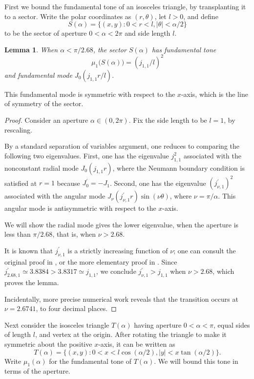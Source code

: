\documentclass[11pt,reqno]{amsart}
\newtheorem{lemma}[theorem]{Lemma}
\numberwithin{equation}{section}
\begin{document}
First we bound the fundamental tone of an isosceles triangle, by
transplanting it to a sector. Write the polar coordinates as $(r,\theta)$, let $l>0$, and define
\[
S(\alpha) = \{ (x,y) : 0<r<l, |\theta| < \alpha/2 \}
\]
to be the sector of aperture $0<\alpha<2\pi$ and side length $l$.
\begin{lemma} \label{le:sector}
When $\alpha < \pi/2.68$, the sector $S(\alpha)$ has
fundamental tone
\[
\mu_1 \big( S(\alpha) \big) = (j_{1,1}/l)^2
\]
and fundamental mode $J_0(j_{1,1}r/l)$.
\end{lemma}
This fundamental mode is symmetric with respect to the $x$-axis, which is the line of symmetry of the sector.
\begin{proof}
Consider an aperture $\alpha \in (0,2\pi)$. Fix the side length to be $l=1$, by rescaling. 

By a standard separation of variables argument, one reduces to comparing the
following two eigenvalues. First, one has the eigenvalue
$j_{1,1}^2$ associated with the nonconstant radial mode
$J_0(j_{1,1} r)$, where the Neumann boundary condition is satisfied at $r=1$ because $J_0^\prime = - J_1$. Second, one has the eigenvalue
$(j_{\nu,1}^\prime)^2$ associated with the angular mode
$J_\nu(j_{\nu,1}^\prime r) \sin (\nu \theta)$,  where $\nu=\pi/\alpha$. This angular mode is antisymmetric with respect to the $x$-axis.

We will show the radial mode gives the lower eigenvalue, when the
aperture is less than $\pi/2.68$, that is, when $\nu > 2.68$. 

It is known that $j_{\nu,1}^\prime$ is a strictly increasing function of $\nu$; one can consult the original proof in \cite[p.~510]{W52}, or the more elementary proof in \cite{L90}. Since $j_{2.68,1}^\prime \simeq 3.8384 > 3.8317 \simeq j_{1,1}$, we conclude $j_{\nu,1}^\prime > j_{1,1}$ when $\nu > 2.68$, which proves the lemma.

Incidentally, more precise numerical work reveals that the transition occurs at $\nu=2.6741$, to four decimal places.
\end{proof}

Next consider the isosceles triangle $T(\alpha)$ having aperture
$0<\alpha<\pi$, equal sides of length $l$, and vertex at the origin.
After rotating the triangle to make it symmetric about the
positive $x$-axis, it can be written as
\[
T(\alpha) = \{ (x,y) : 0<x<l\cos(\alpha/2), |y|<x\tan(\alpha/2) \} .
\]
Write $\mu_1(\alpha)$ for the fundamental tone of $T(\alpha)$. We will bound this tone in terms of the aperture.
\end{document}
